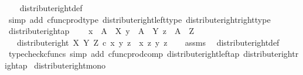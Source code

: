 \begin{isabellebody}
%
\isadelimproof
\ \ %
\endisadelimproof
%
\isatagproof
{}\isamarkupfalse%
\ distribute{\isacharunderscore}{\kern0pt}right{\isacharunderscore}{\kern0pt}def\isanewline
\ \ \isamarkupfalse%
\ {\isacharparenleft}{\kern0pt}simp\ add{\isacharcolon}{\kern0pt}\ cfunc{\isacharunderscore}{\kern0pt}prod{\isacharunderscore}{\kern0pt}type\ distribute{\isacharunderscore}{\kern0pt}right{\isacharunderscore}{\kern0pt}left{\isacharunderscore}{\kern0pt}type\ distribute{\isacharunderscore}{\kern0pt}right{\isacharunderscore}{\kern0pt}right{\isacharunderscore}{\kern0pt}type{\isacharparenright}{\kern0pt}%
\endisatagproof
{\isafoldproof}%
%
\isadelimproof
\isanewline
%
\endisadelimproof
\isanewline
{}\isamarkupfalse%
\ distribute{\isacharunderscore}{\kern0pt}right{\isacharunderscore}{\kern0pt}ap{\isacharcolon}{\kern0pt}\ \isanewline
\ \ \ {\isachardoublequoteopen}x\ {\isacharcolon}{\kern0pt}\ A\ {\isasymrightarrow}\ X{\isachardoublequoteclose}\ {\isachardoublequoteopen}y\ {\isacharcolon}{\kern0pt}\ A\ {\isasymrightarrow}\ Y{\isachardoublequoteclose}\ {\isachardoublequoteopen}z\ {\isacharcolon}{\kern0pt}\ A\ {\isasymrightarrow}\ Z{\isachardoublequoteclose}\isanewline
\ \ \ {\isachardoublequoteopen}distribute{\isacharunderscore}{\kern0pt}right\ X\ Y\ Z\ {\isasymcirc}\isactrlsub c\ {\isasymlangle}{\isasymlangle}x{\isacharcomma}{\kern0pt}\ y{\isasymrangle}{\isacharcomma}{\kern0pt}\ z{\isasymrangle}\ {\isacharequal}{\kern0pt}\ {\isasymlangle}{\isasymlangle}x{\isacharcomma}{\kern0pt}\ z{\isasymrangle}{\isacharcomma}{\kern0pt}\ {\isasymlangle}y{\isacharcomma}{\kern0pt}\ z{\isasymrangle}{\isasymrangle}{\isachardoublequoteclose}\isanewline
%
\isadelimproof
\ \ %
\endisadelimproof
%
\isatagproof
{}\isamarkupfalse%
\ assms\ \isamarkupfalse%
\ distribute{\isacharunderscore}{\kern0pt}right{\isacharunderscore}{\kern0pt}def\ \ \isanewline
\ \ \isamarkupfalse%
\ {\isacharparenleft}{\kern0pt}typecheck{\isacharunderscore}{\kern0pt}cfuncs{\isacharcomma}{\kern0pt}\ simp\ add{\isacharcolon}{\kern0pt}\ cfunc{\isacharunderscore}{\kern0pt}prod{\isacharunderscore}{\kern0pt}comp\ distribute{\isacharunderscore}{\kern0pt}right{\isacharunderscore}{\kern0pt}left{\isacharunderscore}{\kern0pt}ap\ distribute{\isacharunderscore}{\kern0pt}right{\isacharunderscore}{\kern0pt}right{\isacharunderscore}{\kern0pt}ap{\isacharparenright}{\kern0pt}%
\endisatagproof
{\isafoldproof}%
%
\isadelimproof
\isanewline
%
\endisadelimproof
\isanewline
{}\isamarkupfalse%
\ distribute{\isacharunderscore}{\kern0pt}right{\isacharunderscore}{\kern0pt}mono{\isacharcolon}{\kern0pt}\isanewline

\end{isabellebody}
